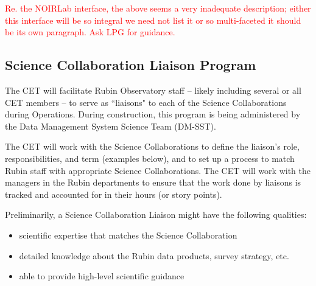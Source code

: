 \documentclass[DM,lsstdraft,toc]{lsstdoc}
\begin{document}
\textcolor{red}{Re. the NOIRLab interface, the above seems a very inadequate description; either this interface will be so integral we need not list it or so multi-faceted it should be its own paragraph. Ask LPG for guidance.}


\subsection{Science Collaboration Liaison Program}\label{sssec:mod_interface_SCliaison}

The CET will facilitate Rubin Observatory staff -- likely including several or all CET members -- to serve as ``liaisons" to each of the Science Collaborations during Operations. 
During construction, this program is being administered by the Data Management System Science Team (DM-SST).

The CET will work with the Science Collaborations to define the liaison's role, responsibilities, and term (examples below), and to set up a process to match Rubin staff with appropriate Science Collaborations.
The CET will work with the managers in the Rubin departments to ensure that the work done by liaisons is tracked and accounted for in their hours (or story points). 

Preliminarily, a Science Collaboration Liaison might have the following qualities:
\begin{itemize}
\item scientific expertise that matches the Science Collaboration
\item detailed knowledge about the Rubin data products, survey strategy, etc. 
\item able to provide high-level scientific guidance 
\end{itemize}
\end{document}
